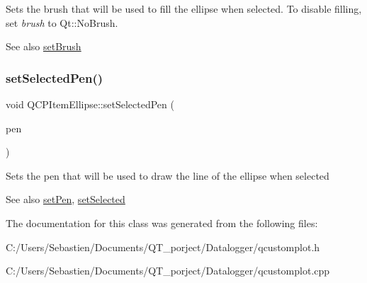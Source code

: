 Sets the brush that will be used to fill the ellipse when selected. To disable filling, set {\itshape brush} to Qt\+::\+No\+Brush.

\begin{DoxySeeAlso}{See also}
\hyperlink{class_q_c_p_item_ellipse_a49fc74e6965834e873d027d026def798}{set\+Brush} 
\end{DoxySeeAlso}
\mbox{\label{class_q_c_p_item_ellipse_a6c542fba1dc918041c583f58a50dde99}} 
\subsubsection{\texorpdfstring{set\+Selected\+Pen()}{setSelectedPen()}}
{\footnotesize\ttfamily void Q\+C\+P\+Item\+Ellipse\+::set\+Selected\+Pen (\begin{DoxyParamCaption}\item[{const Q\+Pen \&}]{pen }\end{DoxyParamCaption})}

Sets the pen that will be used to draw the line of the ellipse when selected

\begin{DoxySeeAlso}{See also}
\hyperlink{class_q_c_p_item_ellipse_adb81a663ed2420fcfa011e49f678d1a6}{set\+Pen}, \hyperlink{class_q_c_p_abstract_item_a203de94ad586cc44d16c9565f49d3378}{set\+Selected} 
\end{DoxySeeAlso}


The documentation for this class was generated from the following files\+:\begin{DoxyCompactItemize}
\item 
C\+:/\+Users/\+Sebastien/\+Documents/\+Q\+T\+\_\+porject/\+Datalogger/qcustomplot.\+h\item 
C\+:/\+Users/\+Sebastien/\+Documents/\+Q\+T\+\_\+porject/\+Datalogger/qcustomplot.\+cpp\end{DoxyCompactItemize}
